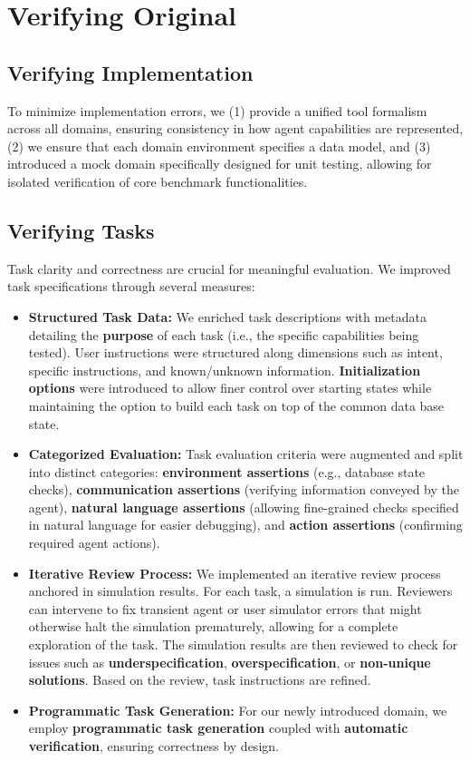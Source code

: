 \section{Verifying Original \bench}
\label{app:verify_tau}

\subsection{Verifying Implementation}

To minimize implementation errors, we (1) provide a unified tool formalism across all domains, ensuring consistency in how agent capabilities are represented, (2) we ensure that each domain environment specifies a data model, and (3) introduced a mock domain specifically designed for unit testing, allowing for isolated verification of core benchmark functionalities.

\subsection{Verifying Tasks}

Task clarity and correctness are crucial for meaningful evaluation. We improved task specifications through several measures:
\begin{itemize}
    \item \textbf{Structured Task Data:} We enriched task descriptions with metadata detailing the \textbf{purpose} of each task (i.e., the specific capabilities being tested). User instructions were structured along dimensions such as intent, specific instructions, and known/unknown information. \textbf{Initialization options} were introduced to allow finer control over starting states while maintaining the option to build each task on top of the common data base state.
    \item \textbf{Categorized Evaluation:} Task evaluation criteria were augmented and split into distinct categories: \textbf{environment assertions} (e.g., database state checks), \textbf{communication assertions} (verifying information conveyed by the agent), \textbf{natural language assertions} (allowing fine-grained checks specified in natural language for easier debugging), and \textbf{action assertions} (confirming required agent actions).
    \item \textbf{Iterative Review Process:} We implemented an iterative review process anchored in simulation results. For each task, a simulation is run. Reviewers can intervene to fix transient agent or user simulator errors that might otherwise halt the simulation prematurely, allowing for a complete exploration of the task. The simulation results are then reviewed to check for issues such as \textbf{underspecification}, \textbf{overspecification}, or \textbf{non-unique solutions}. Based on the review, task instructions are refined.
    \item \textbf{Programmatic Task Generation:} For our newly introduced domain, we employ \textbf{programmatic task generation} coupled with \textbf{automatic verification}, ensuring correctness by design.
\end{itemize}
